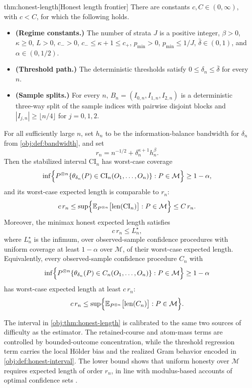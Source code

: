 \documentclass[11pt]{article}
\begin{document}
\begin{theoremv}{thm:honest-length}[Honest length frontier]
There are constants \(c,C\in(0,\infty)\), with \(c<C\), for which the following holds.

\begin{itemize}
\item \textbf{(Regime constants.)} The number of strata \(J\) is a positive integer, \(\beta>0\), \(\kappa\geq0\), \(L>0\), \(c_->0\), \(c_-\leq \kappa+1\leq c_+\), \(p_{\min}>0\), \(p_{\min}\leq 1/J\), \(\bar\delta\in(0,1)\), and \(\alpha\in(0,1/2)\).
\item \textbf{(Threshold path.)} The deterministic thresholds satisfy \(0\leq \delta_n\leq \bar\delta\) for every \(n\).
\item \textbf{(Sample splits.)} For every \(n\), \(B_n=(I_{0,n},I_{1,n},I_{2,n})\) is a deterministic three-way split of the sample indices with pairwise disjoint blocks and \(|I_{j,n}|\geq \lfloor n/4\rfloor\) for \(j=0,1,2\).
\end{itemize}

For all sufficiently large \(n\), set \(h_n\) to be the information-balance bandwidth for \(\delta_n\) from \cref{obj:def:bandwidth}, and set
\[
r_n=n^{-1/2}+\delta_n^{\kappa+1}h_n^\beta .
\]
Then the stabilized interval \(\mathrm{CI}_n\) has worst-case coverage
\[
\inf\Bigl\{
P^{\otimes n}\{\theta_{\delta_n}(P)\in \mathrm{CI}_n(O_1,\ldots,O_n)\}:
P\in\mathcal M
\Bigr\}\geq 1-\alpha,
\]
and its worst-case expected length is comparable to \(r_n\):
\[
c\,r_n
\leq
\sup\Bigl\{
\mathbb E_{P^{\otimes n}}\bigl[\operatorname{len}(\mathrm{CI}_n)\bigr]:
P\in\mathcal M
\Bigr\}
\leq
C\,r_n .
\]
Moreover, the minimax honest expected length satisfies
\[
c\,r_n
\leq
L_n^\star,
\]
where \(L_n^\star\) is the infimum, over observed-sample confidence procedures with uniform coverage at least \(1-\alpha\) over \(\mathcal M\), of their worst-case expected length. Equivalently, every observed-sample confidence procedure \(C_n\) with
\[
\inf\Bigl\{
P^{\otimes n}\{\theta_{\delta_n}(P)\in C_n(O_1,\ldots,O_n)\}:
P\in\mathcal M
\Bigr\}\geq 1-\alpha
\]
has worst-case expected length at least \(c\,r_n\):
\[
c\,r_n
\leq
\sup\Bigl\{
\mathbb E_{P^{\otimes n}}\bigl[\operatorname{len}(C_n)\bigr]:
P\in\mathcal M
\Bigr\}.
\]
\end{theoremv}

The interval in \cref{obj:thm:honest-length} is calibrated to the same two sources of difficulty as the estimator. The retained-course and atom-mass terms are controlled by bounded-outcome concentration, while the threshold regression term carries the local Hölder bias and the realized Gram behavior encoded in \cref{obj:def:honest-interval}. The lower bound shows that uniform honesty over \(\mathcal M\) requires expected length of order \(r_n\), in line with modulus-based accounts of optimal confidence sets \citep{Low1997NonparametricConfidenceIntervals,ArmstrongKolesar2020}.
\end{document}
